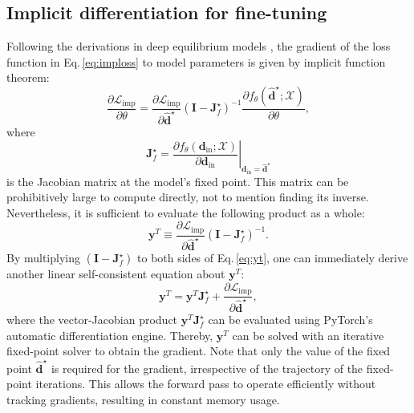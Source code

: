 \documentclass[%
reprint,
superscriptaddress,
bibnotes,
amsmath,amssymb,
aps,
floatfix, %
]{revtex4-2}
\begin{document}
\subsection{\label{sec:impdiff}Implicit differentiation for fine-tuning}
\noindent Following the derivations in deep equilibrium models \cite{bai2019deq}, the gradient of the loss function in Eq.\,\eqref{eq:imploss} to model parameters is given by implicit function theorem:
\begin{equation}
  \frac{\partial \mathcal{L}_\text{imp}}{\partial \theta } = \frac{\partial \mathcal{L}_\text{imp}}{\partial \hat{\mathbf{d}}^\star}(\mathbf{I}- \mathbf{J}_f^\star)^{-1} \frac{\partial f_\theta(\hat{\mathbf{d}}^\star; \mathcal{X})}{\partial \theta},
\end{equation}
where
\begin{equation}
  \mathbf{J}_f^\star = \left.\frac{\partial f_\theta(\mathbf{d}_\text{in}; \mathcal{X})}{\partial \mathbf{d}_\text{in}} \right\rvert_{\mathbf{d}_\text{in} = \hat{\mathbf{d}}^\star}
\end{equation}
is the Jacobian matrix at the model's fixed point. This matrix can be prohibitively large to compute directly, not to mention finding its inverse. Nevertheless, it is sufficient to evaluate the following product as a whole:
\begin{equation}
  \label{eq:yt}
  \mathbf{y}^T \equiv \frac{\partial \mathcal{L}_\text{imp}}{\partial \hat{\mathbf{d}}^\star}(\mathbf{I}- \mathbf{J}_f^\star)^{-1}.
\end{equation}
By multiplying $(\mathbf{I}- \mathbf{J}_f^\star)$ to both sides of Eq.\,\eqref{eq:yt}, one can immediately derive another linear self-consistent equation about $\mathbf{y}^T$:
\begin{equation}
  \mathbf{y}^T = \mathbf{y}^T \mathbf{J}_f^\star + \frac{\partial \mathcal{L}_\text{imp}}{\partial \hat{\mathbf{d}}^\star},
  \label{back}
\end{equation}
where the vector-Jacobian product $\mathbf{y}^T \mathbf{J}_f^\star$ can be evaluated using PyTorch's automatic differentiation engine. Thereby, $\mathbf{y}^T$ can be solved with an iterative fixed-point solver to obtain the gradient. Note that only the value of the fixed point $\hat{\mathbf{d}}^\star$ is required for the gradient, irrespective of the trajectory of the fixed-point iterations. This allows the forward pass to operate efficiently without tracking gradients, resulting in constant memory usage.
\end{document}
